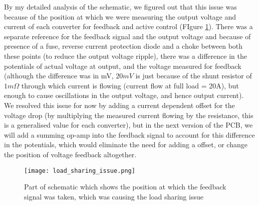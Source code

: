\begin{itemize}
    By my detailed analysis of the schematic, we figured out that this issue was because of the position at which we were measuring the output voltage and current of each converter for feedback and active control (FIgure \ref{fig:load_sharing}). There was a separate reference for the feedback signal and the output voltage and because of presence of a fuse, reverse current protection diode and a choke between both these points (to reduce the output voltage ripple), there was a difference in the potentials of actual voltage at output, and the voltage measured for feedback (although the difference was in mV, $20mV$ is just because of the shunt resistor of $1m\Omega$ through which current is flowing (current flow at full load = 20A), but enough to cause oscillations in the output voltage, and hence output current).\\
    We resolved this issue for now by adding a current dependent offset for the voltage drop (by multiplying the measured current flowing by the resistance, this is a generalised value for each converter), but in the next version of the PCB, we will add a summing op-amp into the feedback signal to account for this difference in the potentials, which would eliminate the need for adding a offset, or change the position of voltage feedback altogether.
    \begin{figure}[H]
        \centering
        \texttt{[image: load\_sharing\_issue.png]}
        \caption{Part of schematic which shows the position at which the feedback signal was taken, which was causing the load sharing issue}
        \label{fig:load_sharing}
    \end{figure}
\end{itemize}
